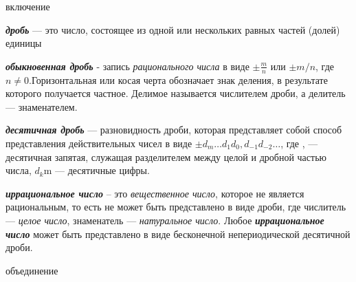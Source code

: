 \begin{SCn}
\begin{scnrelfromlist}{включение}
\end{scnrelfromlist}
\end{SCn}

\textbf{\textit{дробь}} — это число, состоящее из одной или нескольких равных частей (долей) единицы

\begin{SCn}
\end{SCn}

\textbf{\textit{обыкновенная дробь}} - запись \textit{рационального числа} в виде ${\displaystyle \pm {\frac {m}{n}}}$ или ${\pm m/n}$, где ${n\neq 0}$.Горизонтальная или косая черта обозначает знак деления, в результате которого получается частное. Делимое называется числителем дроби, а делитель — знаменателем.

\begin{SCn}
\end{SCn}

\textbf{\textit{десятичная дробь}} — разновидность дроби, которая представляет собой способ представления действительных чисел в виде ${\pm d_m \ldots d_1 d_0{,} d_{-1} d_{-2} \ldots}$, где , — десятичная запятая, служащая разделителем между целой и дробной частью числа, ${d_{k}}$m — десятичные цифры.

\begin{SCn}
\end{SCn}

\textbf{\textit{иррациональное число}} -- это \textit{вещественное число}, которое не является рациональным, то есть не может быть представлено в виде дроби, где числитель — \textit{целое число}, знаменатель — \textit{натуральное число}. Любое \textbf{\textit{иррациональное число}} может быть представлено в виде бесконечной непериодической десятичной дроби.

\begin{SCn}
\begin{scnreltoset}{объединение}
\end{scnreltoset}
\begin{scnsubdividing}
\end{scnsubdividing}
\end{SCn}

